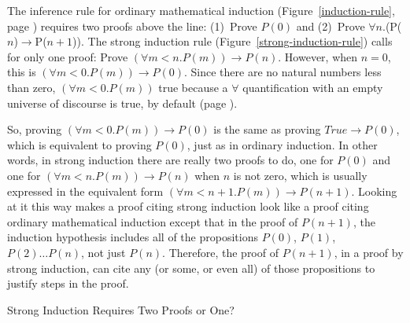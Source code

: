 \begin{aside}
The inference rule for ordinary mathematical induction
(Figure~\ref{induction-rule}, page \pageref{induction-rule})
requires two proofs above the line:
(1)~Prove $P(0)$ and (2)~Prove $\forall$$n$.(P($n$)$\rightarrow$P($n+1$)).
The strong induction rule
(Figure~\ref{strong-induction-rule})
calls for only one proof:
Prove $(\forall m<n.P(m))\rightarrow P(n)$.
However, when $n = 0$, this is
$(\forall m<0.P(m))\rightarrow P(0)$.
Since there
are no natural numbers less than zero,
$(\forall m<0.P(m))$ true because
a $\forall$ quantification with an empty universe of discourse
is true, by default
(page \pageref{empty-forall}).

So, proving $(\forall m<0.P(m))\rightarrow P(0)$
is the same as proving $True \rightarrow P(0)$,
which is equivalent to proving $P(0)$,
just as in ordinary induction.
In other words, in strong induction there are really two proofs to do,
one for $P(0)$ and one for $(\forall m<n.P(m))\rightarrow P(n)$
when $n$ is not zero, which is usually expressed in the
equivalent form $(\forall m<n+1.P(m))\rightarrow P(n+1)$.
Looking at it this way makes a proof citing strong induction look like
a proof citing ordinary mathematical induction except that
in the proof of $P(n+1)$, the
induction hypothesis
includes all of the propositions $P(0)$, $P(1)$, $P(2) \dots P(n)$, not just $P(n)$.
Therefore, the proof of $P(n+1)$, in a proof by strong induction, can cite any
(or some, or even all) of those propositions to justify steps in the proof.
\caption{Strong Induction Requires Two Proofs or One?}
\label{strong-induction-rule-2-hyps-or-1}
\end{aside}


